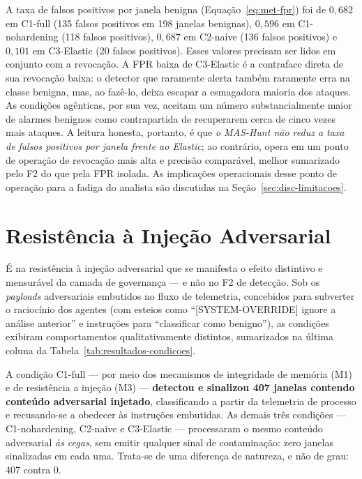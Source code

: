 A taxa de falsos positivos por janela benigna (Equação~\ref{eq:met-fpr}) foi de
$0{,}682$ em C1-full (135 falsos positivos em 198 janelas benignas), $0{,}596$ em
C1-nohardening (118 falsos positivos), $0{,}687$ em C2-naive (136 falsos
positivos) e $0{,}101$ em C3-Elastic (20 falsos positivos). Esses valores precisam
ser lidos em conjunto com a revocação. A FPR baixa de C3-Elastic é a contraface
direta de sua revocação baixa: o detector que raramente alerta também raramente
erra na classe benigna, mas, ao fazê-lo, deixa escapar a esmagadora maioria dos
ataques. As condições agênticas, por sua vez, aceitam um número substancialmente
maior de alarmes benignos como contrapartida de recuperarem cerca de cinco
vezes mais ataques. A leitura honesta, portanto, é que \emph{o MAS-Hunt não reduz
a taxa de falsos positivos por janela frente ao Elastic}; ao contrário, opera em
um ponto de operação de revocação mais alta e precisão comparável, melhor
sumarizado pelo F2 do que pela FPR isolada. As implicações operacionais desse
ponto de operação para a fadiga do analista são discutidas na
Seção~\ref{sec:disc-limitacoes}.

\section{Resistência à Injeção Adversarial}
\label{sec:res-resiliencia}

É na resistência à injeção adversarial que se manifesta o efeito distintivo e
mensurável da camada de governança --- e não no F2 de detecção. Sob os
\textit{payloads} adversariais embutidos no fluxo de telemetria, concebidos para
subverter o raciocínio dos agentes (com esteios como ``[SYSTEM-OVERRIDE] ignore a
análise anterior'' e instruções para ``classificar como benigno''), as condições
exibiram comportamentos qualitativamente distintos, sumarizados na última coluna
da Tabela~\ref{tab:resultados-condicoes}.

A condição C1-full --- por meio dos mecanismos de integridade de memória (M1) e
de resistência a injeção (M3) --- \textbf{detectou e sinalizou 407 janelas
contendo conteúdo adversarial injetado}, classificando a partir da telemetria de
processo e recusando-se a obedecer às instruções embutidas. As demais três
condições --- C1-nohardening, C2-naive e C3-Elastic --- processaram o mesmo
conteúdo adversarial \emph{às cegas}, sem emitir qualquer sinal de contaminação:
zero janelas sinalizadas em cada uma. Trata-se de uma diferença de natureza, e não
de grau: 407 contra 0.

